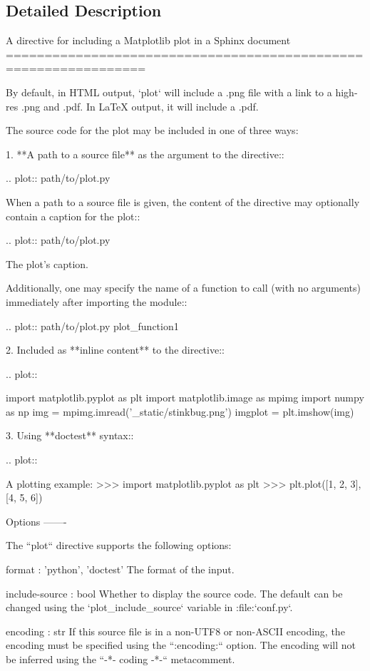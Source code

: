 \subsection{Detailed Description}
\begin{DoxyVerb}A directive for including a Matplotlib plot in a Sphinx document
================================================================

By default, in HTML output, `plot` will include a .png file with a link to a
high-res .png and .pdf.  In LaTeX output, it will include a .pdf.

The source code for the plot may be included in one of three ways:

1. **A path to a source file** as the argument to the directive::

     .. plot:: path/to/plot.py

   When a path to a source file is given, the content of the
   directive may optionally contain a caption for the plot::

     .. plot:: path/to/plot.py

The plot's caption.

   Additionally, one may specify the name of a function to call (with
   no arguments) immediately after importing the module::

     .. plot:: path/to/plot.py plot_function1

2. Included as **inline content** to the directive::

     .. plot::

import matplotlib.pyplot as plt
import matplotlib.image as mpimg
import numpy as np
img = mpimg.imread('_static/stinkbug.png')
imgplot = plt.imshow(img)

3. Using **doctest** syntax::

     .. plot::

A plotting example:
>>> import matplotlib.pyplot as plt
>>> plt.plot([1, 2, 3], [4, 5, 6])

Options
-------

The ``plot`` directive supports the following options:

    format : {'python', 'doctest'}
The format of the input.

    include-source : bool
Whether to display the source code. The default can be changed
using the `plot_include_source` variable in :file:`conf.py`.

    encoding : str
If this source file is in a non-UTF8 or non-ASCII encoding, the
encoding must be specified using the ``:encoding:`` option.  The
encoding will not be inferred using the ``-*- coding -*-`` metacomment.


\end{DoxyVerb}
